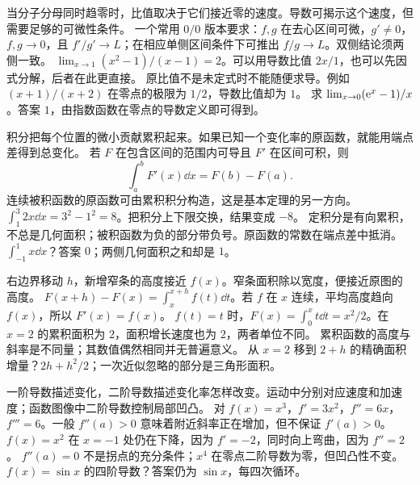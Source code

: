 \idea 当分子分母同时趋零时，比值取决于它们接近零的速度。导数可揭示这个速度，但需要足够的可微性条件。
\mathpart 一个常用 $0/0$ 版本要求：$f,g$ 在去心区间可微，$g'\ne0$，$f,g\to0$，且 $f'/g'\to L$；在相应单侧区间条件下可推出 $f/g\to L$。双侧结论须两侧一致。
\examplepart $\lim_{x\to1}(x^2-1)/(x-1)=2$。可以用导数比值 $2x/1$，也可以先因式分解，后者在此更直接。
\pitfall 原比值不是未定式时不能随便求导。例如 $(x+1)/(x+2)$ 在零点的极限为 $1/2$，导数比值却为 $1$。
\exercise 求 $\lim_{x\to0}(\mathrm e^x-1)/x$。答案 $1$，由指数函数在零点的导数定义即可得到。
\nextlesson

\idea 积分把每个位置的微小贡献累积起来。如果已知一个变化率的原函数，就能用端点差得到总变化。
\mathpart 若 $F$ 在包含区间的范围内可导且 $F'$ 在区间可积，则
\[\int_a^b F'(x)\dd x=F(b)-F(a).\]
连续被积函数的原函数可由累积积分构造，这是基本定理的另一方向。
\examplepart $\int_1^3 2x\dd x=3^2-1^2=8$。把积分上下限交换，结果变成 $-8$。
\pitfall 定积分是有向累积，不总是几何面积；被积函数为负的部分带负号。原函数的常数在端点差中抵消。
\exercise $\int_{-1}^1 x\dd x$？答案 $0$；两侧几何面积之和却是 $1$。
\nextlesson

\idea 右边界移动 $h$，新增窄条的高度接近 $f(x)$。窄条面积除以宽度，便接近原图的高度。
\mathpart $F(x+h)-F(x)=\int_x^{x+h}f(t)\dd t$。若 $f$ 在 $x$ 连续，平均高度趋向 $f(x)$，所以 $F'(x)=f(x)$。
\examplepart $f(t)=t$ 时，$F(x)=\int_0^x t\dd t=x^2/2$。在 $x=2$ 的累积面积为 $2$，面积增长速度也为 $2$，两者单位不同。
\pitfall 累积函数的高度与斜率是不同量；其数值偶然相同并无普遍意义。
\exercise 从 $x=2$ 移到 $2+h$ 的精确面积增量？$2h+h^2/2$；一次近似忽略的部分是三角形面积。
\nextlesson

\idea 一阶导数描述变化，二阶导数描述变化率怎样改变。运动中分别对应速度和加速度；函数图像中二阶导数控制局部凹凸。
\mathpart 对 $f(x)=x^3$，$f'=3x^2$，$f''=6x$，$f'''=6$。一般 $f''(a)>0$ 意味着附近斜率正在增加，但不保证 $f'(a)>0$。
\examplepart $f(x)=x^2$ 在 $x=-1$ 处仍在下降，因为 $f'=-2$，同时向上弯曲，因为 $f''=2$。
\pitfall $f''(a)=0$ 不是拐点的充分条件；$x^4$ 在零点二阶导数为零，但凹凸性不变。
\exercise $f(x)=\sin x$ 的四阶导数？答案仍为 $\sin x$，每四次循环。
\nextlesson

